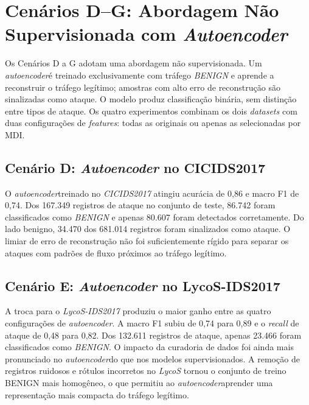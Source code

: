 \section{Cenários D–G: Abordagem Não Supervisionada com \textit{Autoencoder}}

Os Cenários D a G adotam uma abordagem não supervisionada. Um \textit{autoencoder}é treinado exclusivamente com tráfego \textit{BENIGN} e aprende a reconstruir o tráfego legítimo; amostras com alto erro de reconstrução são sinalizadas como ataque. O modelo produz classificação binária, sem distinção entre tipos de ataque. Os quatro experimentos combinam os dois \textit{datasets} com duas configurações de \textit{features}: todas as originais ou apenas as selecionadas por MDI.

\subsection{Cenário D: \textit{Autoencoder} no CICIDS2017}





O \textit{autoencoder}treinado no \textit{CICIDS2017} atingiu acurácia de 0,86 e macro F1 de 0,74. Dos 167.349 registros de ataque no conjunto de teste, 86.742 foram classificados como \textit{BENIGN} e apenas 80.607 foram detectados corretamente. Do lado benigno, 34.470 dos 681.014 registros foram sinalizados como ataque. O limiar de erro de reconstrução não foi suficientemente rígido para separar os ataques com padrões de fluxo próximos ao tráfego legítimo.

\subsection{Cenário E: \textit{Autoencoder} no LycoS-IDS2017}





A troca para o \textit{LycoS-IDS2017} produziu o maior ganho entre as quatro configurações de \textit{autoencoder}. A macro F1 subiu de 0,74 para 0,89 e o \textit{recall} de ataque de 0,48 para 0,82. Dos 132.611 registros de ataque, apenas 23.466 foram classificados como \textit{BENIGN}. O impacto da curadoria de dados foi ainda mais pronunciado no \textit{autoencoder}do que nos modelos supervisionados. A remoção de registros ruidosos e rótulos incorretos no \textit{LycoS} tornou o conjunto de treino BENIGN mais homogêneo, o que permitiu ao \textit{autoencoder}aprender uma representação mais compacta do tráfego legítimo.

